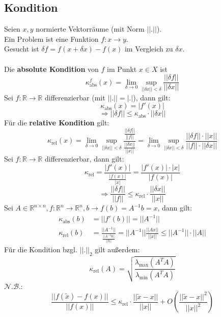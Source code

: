 \documentclass[4pt,a4paper]{scrartcl}
\begin{document}
\begin{multicols}{4}
\subsection{Kondition}
Seien $x,y$ normierte Vektorräume (mit Norm $||.||$).\\
Ein Problem ist eine Funktion $f:x\rightarrow y$.\\
Gesucht ist $\delta f=f(x+\delta x)-f(x)$ im Vergleich zu $\delta x$.\\\\
Die \textbf{absolute Kondition} von $f$ im Punkt $x\in X$ ist
\begin{equation*}
\kappa_{\text{abs}}^f(x)=\lim\limits_{\delta\rightarrow 0}\sup\limits_{||\delta x||<\delta}\frac{||\delta f||}{||\delta x||}
\end{equation*}
Sei $f:\mathbb{R}\rightarrow\mathbb{R}$ differenzierbar (mit $||.||=|.|$), dann gilt:
\begin{equation*}
\kappa_{\text{abs}}(x)=|f'(x)|
\end{equation*}
\begin{equation*}
\Rightarrow||\delta f||\leq \kappa_{\text{abs}}\cdot ||\delta x||
\end{equation*}
Für die \textbf{relative Kondition} gilt:
\begin{equation*}
\kappa_{\text{rel}}(x)=\lim\limits_{\delta\rightarrow 0}\sup\limits_{||\delta x||<\delta} \frac{\frac{||\delta f||}{||f||}}{\frac{||\delta x||}{||x||}}=\lim\limits_{\delta\rightarrow 0}\sup\limits_{||\delta x||<\delta} \frac{||\delta f||\cdot ||x||}{||f||\cdot ||\delta x||}
\end{equation*}
Sei $f:\mathbb{R}\rightarrow\mathbb{R}$ differenzierbar, dann gilt:
\begin{equation*}
\kappa_{\text{rel}}=\frac{|f'(x)|}{\frac{|f(x)|}{|x|}}=\frac{|f'(x)|\cdot |x|}{|f(x)|}
\end{equation*}
\begin{equation*}
\Rightarrow\frac{||\delta f||}{||f||}\leq \kappa_{\text{rel}}\cdot\frac{||\delta x||}{||x||}
\end{equation*}
Sei $A\in\mathbb{R}^{n\times n},f:\mathbb{R}^n\rightarrow\mathbb{R}^n,b\rightarrow f(b)=A^{-1}b=x$, dann gilt:
\begin{equation*}
\begin{split}
\kappa_{\text{abs}}(b)&=||f'(b)||=||A^{-1}||\\
\kappa_{\text{rel}}(b)&=\frac{||A^{-1}||}{\frac{||A^{-1}b||}{||b||}}=||A^{-1}||\frac{||Ax||}{||x||}\leq||A^{-1}||\cdot ||A||
\end{split}
\end{equation*}
Für die Kondition bzgl. $||.||_2$ gilt außerdem:
\begin{equation*}
\kappa_{\text{rel}}(A)=\sqrt{\frac{\lambda_{\text{max}}(A^TA)}{\lambda_{\text{min}}(A^TA)}}
\end{equation*}
$\mathcal{N.B.}$:
\begin{equation*}
\frac{||f(\tilde{x})-f(x)||}{||f(x)||}\leq \kappa_{\text{rel}}\cdot\frac{||\tilde{x}-x||}{||x||}+O\left(\frac{||\tilde{x}-x||^2}{||x||^2}\right)
\end{equation*}


\end{multicols}
\end{document}
